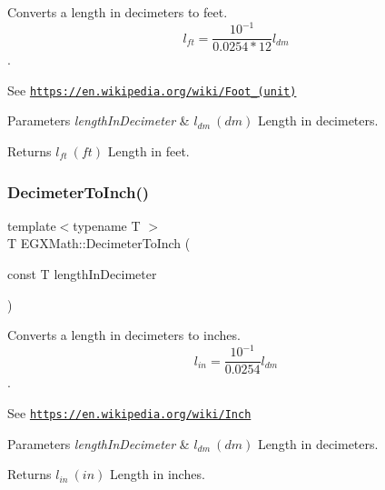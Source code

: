 Converts a length in decimeters to feet. \[ l_{ft}= \frac{10^{-1}}{0.0254 * 12} l_{dm} \]. 

See \href{https://en.wikipedia.org/wiki/Foot_(unit)}{\tt https\+://en.\+wikipedia.\+org/wiki/\+Foot\+\_\+(unit)} 
\begin{DoxyParams}{Parameters}
{\em length\+In\+Decimeter} & $ l_{dm}\ (dm)$ Length in decimeters. \\
\hline
\end{DoxyParams}
\begin{DoxyReturn}{Returns}
$ l_{ft}\ (ft)$ Length in feet. 
\end{DoxyReturn}
\mbox{\label{group___e_g_x_math-_conversions-_length_conversions-_s_i-_decimeter-_imperial_ga51bb6347b1c3ca746b7a3eadc3852e37}} 
\subsubsection{\texorpdfstring{Decimeter\+To\+Inch()}{DecimeterToInch()}}
{\footnotesize\ttfamily template$<$typename T $>$ \\
T E\+G\+X\+Math\+::\+Decimeter\+To\+Inch (\begin{DoxyParamCaption}\item[{const T}]{length\+In\+Decimeter }\end{DoxyParamCaption})}



Converts a length in decimeters to inches. \[ l_{in}= \frac{10^{-1}}{0.0254} l_{dm} \]. 

See \href{https://en.wikipedia.org/wiki/Inch}{\tt https\+://en.\+wikipedia.\+org/wiki/\+Inch} 
\begin{DoxyParams}{Parameters}
{\em length\+In\+Decimeter} & $ l_{dm}\ (dm)$ Length in decimeters. \\
\hline
\end{DoxyParams}
\begin{DoxyReturn}{Returns}
$ l_{in}\ (in)$ Length in inches. 
\end{DoxyReturn}
\mbox{\label{group___e_g_x_math-_conversions-_length_conversions-_s_i-_decimeter-_imperial_gad2ce3f2de1fdda0216bdb56c4844b5e5}} 
